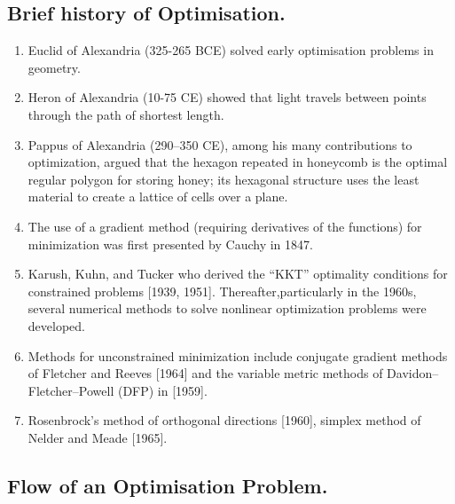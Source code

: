 \documentclass[12pt,a4paper,titlepage]{article}
\begin{document}
\subsection{Brief history of Optimisation.}
\begin{enumerate}
    \item Euclid of Alexandria (325-265 BCE) solved early optimisation problems in geometry.
    \item Heron of Alexandria (10-75 CE) showed that light travels between points through the path of shortest length.
    \item Pappus of Alexandria (290–350 CE), among his many contributions to optimization, argued that the hexagon repeated in honeycomb is the optimal regular polygon for storing honey; its hexagonal structure uses the least material to create a lattice of cells over a plane.
    \item The use of a gradient method (requiring derivatives of the functions) for minimization was first presented by Cauchy in 1847. 
    \item Karush, Kuhn, and Tucker who derived the “KKT” optimality conditions for constrained problems [1939, 1951]. Thereafter,particularly in the 1960s, several numerical methods to solve nonlinear optimization problems were developed.
    \item Methods for unconstrained minimization include conjugate gradient methods of Fletcher and Reeves [1964] and the variable metric methods of Davidon–Fletcher–Powell (DFP) in [1959].
    \item  Rosenbrock's method of orthogonal directions [1960], simplex method of Nelder and Meade [1965]. 
    \end{enumerate}
    
%
\subsection{Flow of an Optimisation Problem.}
\end{document}
